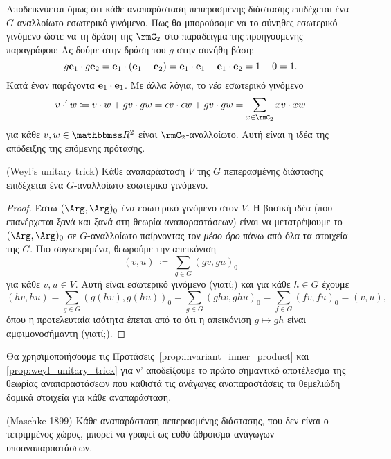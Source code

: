 \documentclass[12pt,a4paper,reqno]{amsart}
\begin{document}
Αποδεικνύεται όμως ότι κάθε αναπαράσταση πεπερασμένης διάστασης επιδέχεται ένα $G$-αναλ\-λοίωτο εσωτερικό γινόμενο. Πως θα μπορούσαμε να  το σύνηθες εσωτερικό γινόμενο ώστε να  τη δράση της $\rmC_2$ στο παράδειγμα της προηγούμενης παραγράφου; Ας δούμε  στην δράση του $g$ στην συνήθη βάση: 
\[
g\mathbf{e}_1 \cdot g\mathbf{e}_2 = \mathbf{e}_1 \cdot(\mathbf{e}_1-\mathbf{e}_2) = \mathbf{e}_1\cdot\mathbf{e}_1 - \mathbf{e}_1\cdot\mathbf{e}_2 = 1 - 0 = 1.
\]
Κατά έναν παράγοντα $\mathbf{e}_1\cdot\mathbf{e}_1$. Με άλλα λόγια, το \emph{νέο} εσωτερικό γινόμενο 
\[
v \cdot' w \coloneqq v \cdot w + gv \cdot gw = \epsilon v \cdot \epsilon w + gv \cdot gw = \sum_{x \in \rmC_2} xv \cdot xw
\]
για κάθε $v, w \in \RR^2$ είναι $\rmC_2$-αναλλοίωτο. Αυτή είναι η ιδέα της απόδειξης της επόμενης πρότασης.


\begin{proposition}{\rm(Weyl's unitary trick)}
    \label{prop:weyl_unitary_trick}
    Κάθε αναπαράσταση $V$ της $G$ πεπερασμένης διάστασης επιδέχεται ένα $G$-αναλλοίωτο εσωτερικό γινόμενο.
\end{proposition}

\begin{proof}
    Έστω $(\Arg,\Arg)_0$ ένα εσωτερικό γινόμενο στον $V$. Η βασική ιδέα (που επανέρχεται ξανά και ξανά στη θεωρία αναπαραστάσεων) είναι να μετατρέψουμε το $(\Arg,\Arg)_0$ σε $G$-αναλλοίωτο παίρνοντας τον \emph{μέσο όρο} πάνω από όλα τα στοιχεία της $G$. Πιο συγκεκριμένα, θεωρούμε την απεικόνιση 
    \[
    (v, u) \ \coloneqq \ \sum_{g \in G} (gv, gu)_0
    \]
    για κάθε $v, u \in V$. Αυτή είναι εσωτερικό γινόμενο (γιατί;) και για κάθε $h \in G$ έχουμε 
    \[
    (hv, hu) = \sum_{g \in G} (g(hv), g(hu))_0 = \sum_{g \in G} (ghv, ghu)_0 = \sum_{f \in G} (fv, fu)_0 = (v,u),
    \]
    όπου η προτελευταία ισότητα έπεται από το ότι η απεικόνιση $g \mapsto gh$ είναι αμφιμονοσήμαντη (γιατί;).
\end{proof}

Θα χρησιμοποιήσουμε τις Προτάσεις~\ref{prop:invariant_inner_product} και \ref{prop:weyl_unitary_trick} για ν' αποδείξουμε το πρώτο σημαντικό αποτέλεσμα της θεωρίας αναπαραστάσεων που καθιστά τις ανάγωγες αναπαραστάσεις τα θεμελιώδη δομικά στοιχεία για κάθε αναπαράσταση.

\begin{theorem}{\rm(Maschke 1899)}
    \label{thm:maschke}
    Κάθε αναπαράσταση πεπερασμένης διάστασης, που δεν είναι ο τετριμμένος χώρος, μπορεί να γραφεί ως ευθύ άθροισμα ανάγωγων υποαναπαραστά\-σεων.
\end{theorem}
\end{document}
